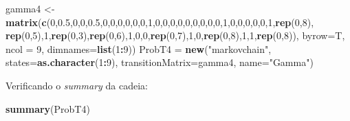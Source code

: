 \documentclass[
]{article}
\newenvironment{Shaded}{\begin{snugshade}}{\end{snugshade}}
\newcommand{\DataTypeTok}[1]{\textcolor[rgb]{0.13,0.29,0.53}{#1}}
\newcommand{\DecValTok}[1]{\textcolor[rgb]{0.00,0.00,0.81}{#1}}
\newcommand{\FloatTok}[1]{\textcolor[rgb]{0.00,0.00,0.81}{#1}}
\newcommand{\KeywordTok}[1]{\textcolor[rgb]{0.13,0.29,0.53}{\textbf{#1}}}
\newcommand{\NormalTok}[1]{#1}
\newcommand{\OperatorTok}[1]{\textcolor[rgb]{0.81,0.36,0.00}{\textbf{#1}}}
\newcommand{\StringTok}[1]{\textcolor[rgb]{0.31,0.60,0.02}{#1}}
\begin{document}
\begin{Shaded}
\begin{Highlighting}[]
\NormalTok{gamma4 <-}\StringTok{ }\KeywordTok{matrix}\NormalTok{(}\KeywordTok{c}\NormalTok{(}\DecValTok{0}\NormalTok{,}\FloatTok{0.5}\NormalTok{,}\DecValTok{0}\NormalTok{,}\DecValTok{0}\NormalTok{,}\FloatTok{0.5}\NormalTok{,}\DecValTok{0}\NormalTok{,}\DecValTok{0}\NormalTok{,}\DecValTok{0}\NormalTok{,}\DecValTok{0}\NormalTok{,}\DecValTok{0}\NormalTok{,}\DecValTok{0}\NormalTok{,}\DecValTok{1}\NormalTok{,}\DecValTok{0}\NormalTok{,}\DecValTok{0}\NormalTok{,}\DecValTok{0}\NormalTok{,}\DecValTok{0}\NormalTok{,}\DecValTok{0}\NormalTok{,}\DecValTok{0}\NormalTok{,}\DecValTok{0}\NormalTok{,}\DecValTok{0}\NormalTok{,}\DecValTok{0}\NormalTok{,}\DecValTok{1}\NormalTok{,}\DecValTok{0}\NormalTok{,}\DecValTok{0}\NormalTok{,}\DecValTok{0}\NormalTok{,}\DecValTok{0}\NormalTok{,}\DecValTok{0}\NormalTok{,}\DecValTok{1}\NormalTok{,}\KeywordTok{rep}\NormalTok{(}\DecValTok{0}\NormalTok{,}\DecValTok{8}\NormalTok{),}
                  \KeywordTok{rep}\NormalTok{(}\DecValTok{0}\NormalTok{,}\DecValTok{5}\NormalTok{),}\DecValTok{1}\NormalTok{,}\KeywordTok{rep}\NormalTok{(}\DecValTok{0}\NormalTok{,}\DecValTok{3}\NormalTok{),}\KeywordTok{rep}\NormalTok{(}\DecValTok{0}\NormalTok{,}\DecValTok{6}\NormalTok{),}\DecValTok{1}\NormalTok{,}\DecValTok{0}\NormalTok{,}\DecValTok{0}\NormalTok{,}\KeywordTok{rep}\NormalTok{(}\DecValTok{0}\NormalTok{,}\DecValTok{7}\NormalTok{),}\DecValTok{1}\NormalTok{,}\DecValTok{0}\NormalTok{,}\KeywordTok{rep}\NormalTok{(}\DecValTok{0}\NormalTok{,}\DecValTok{8}\NormalTok{),}\DecValTok{1}\NormalTok{,}\DecValTok{1}\NormalTok{,}\KeywordTok{rep}\NormalTok{(}\DecValTok{0}\NormalTok{,}\DecValTok{8}\NormalTok{)), }\DataTypeTok{byrow=}\NormalTok{T, }\DataTypeTok{ncol =} \DecValTok{9}\NormalTok{, }\DataTypeTok{dimnames=}\KeywordTok{list}\NormalTok{(}\DecValTok{1}\OperatorTok{:}\DecValTok{9}\NormalTok{))}
\NormalTok{ProbT4 =}\StringTok{ }\KeywordTok{new}\NormalTok{(}\StringTok{"markovchain"}\NormalTok{, }\DataTypeTok{states=}\KeywordTok{as.character}\NormalTok{(}\DecValTok{1}\OperatorTok{:}\DecValTok{9}\NormalTok{), }\DataTypeTok{transitionMatrix=}\NormalTok{gamma4, }\DataTypeTok{name=}\StringTok{"Gamma"}\NormalTok{)}
\end{Highlighting}
\end{Shaded}

Verificando o \emph{summary} da cadeia:

\begin{Shaded}
\begin{Highlighting}[]
\KeywordTok{summary}\NormalTok{(ProbT4)}
\end{Highlighting}
\end{Shaded}
\end{document}
